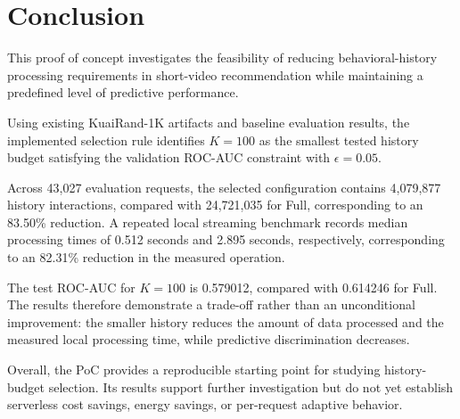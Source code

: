 \documentclass[11pt,a4paper]{article}
\begin{document}
\section{Conclusion}
This proof of concept investigates the feasibility of reducing behavioral-history processing requirements in short-video recommendation while maintaining a predefined level of predictive performance.

Using existing KuaiRand-1K artifacts and baseline evaluation results, the implemented selection rule identifies $K = 100$ as the smallest tested history budget satisfying the validation ROC-AUC constraint with $\epsilon = 0.05$.

Across 43,027 evaluation requests, the selected configuration contains 4,079,877 history interactions, compared with 24,721,035 for Full, corresponding to an 83.50\% reduction. A repeated local streaming benchmark records median processing times of 0.512 seconds and 2.895 seconds, respectively, corresponding to an 82.31\% reduction in the measured operation.

The test ROC-AUC for $K = 100$ is 0.579012, compared with 0.614246 for Full. The results therefore demonstrate a trade-off rather than an unconditional improvement: the smaller history reduces the amount of data processed and the measured local processing time, while predictive discrimination decreases.

Overall, the PoC provides a reproducible starting point for studying history-budget selection. Its results support further investigation but do not yet establish serverless cost savings, energy savings, or per-request adaptive behavior.

\appendix
\end{document}
